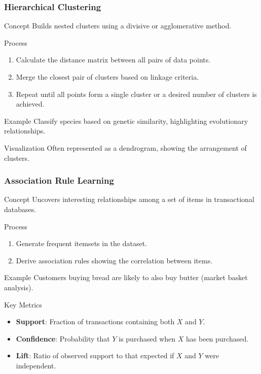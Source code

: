 \documentclass[aspectratio=169]{beamer}
\begin{document}
\begin{frame}[fragile]
    \frametitle{Hierarchical Clustering}
    \begin{block}{Concept}
        Builds nested clusters using a divisive or agglomerative method.
    \end{block}
    \begin{block}{Process}
        \begin{enumerate}
            \item Calculate the distance matrix between all pairs of data points.
            \item Merge the closest pair of clusters based on linkage criteria.
            \item Repeat until all points form a single cluster or a desired number of clusters is achieved.
        \end{enumerate}
    \end{block}
    \begin{block}{Example}
        Classify species based on genetic similarity, highlighting evolutionary relationships.
    \end{block}
    \begin{block}{Visualization}
        Often represented as a dendrogram, showing the arrangement of clusters.
    \end{block}
\end{frame}

\begin{frame}[fragile]
    \frametitle{Association Rule Learning}
    \begin{block}{Concept}
        Uncovers interesting relationships among a set of items in transactional databases.
    \end{block}
    \begin{block}{Process}
        \begin{enumerate}
            \item Generate frequent itemsets in the dataset.
            \item Derive association rules showing the correlation between items.
        \end{enumerate}
    \end{block}
    \begin{block}{Example}
        Customers buying bread are likely to also buy butter (market basket analysis).
    \end{block}
    \begin{block}{Key Metrics}
        \begin{itemize}
            \item \textbf{Support}: Fraction of transactions containing both $X$ and $Y$.
            \item \textbf{Confidence}: Probability that $Y$ is purchased when $X$ has been purchased.
            \item \textbf{Lift}: Ratio of observed support to that expected if $X$ and $Y$ were independent.
        \end{itemize}
    \end{block}
\end{frame}
\end{document}
